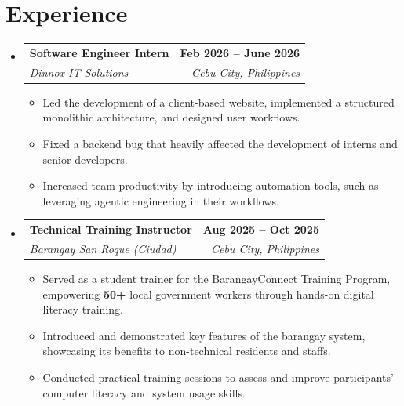 \documentclass[letterpaper,11pt]{article}
\makeatletter
\newcommand{\resumeItem}[1]{
  \item\small{
    {#1 \vspace{0pt}}
  }
}
\newcommand{\resumeSubheading}[4]{
  \vspace{-2pt}\item
    \begin{tabular*}{1.0\textwidth}[t]{l@{\extracolsep{\fill}}r}
      \textbf{#1} & \textbf{\small #2} \\
      \textit{\small#3} & \textit{\small #4} \\
    \end{tabular*}\vspace{-7pt}
}
\newcommand{\resumeSubHeadingListStart}{\begin{itemize}[leftmargin=0.0in, label={}]}
\newcommand{\resumeSubHeadingListEnd}{\end{itemize}}\vspace{0pt}
\newcommand{\resumeItemListStart}{\begin{itemize}}
\newcommand{\resumeItemListEnd}{\end{itemize}\vspace{-5pt}}
\makeatother
\begin{document}
\section{Experience}
    \resumeSubHeadingListStart
      \resumeSubheading{Software Engineer Intern}{Feb 2026 -- June 2026}{Dinnox IT Solutions}{Cebu City, Philippines} 
        \resumeItemListStart
          \resumeItem{Led the development of a client-based website, implemented a structured monolithic architecture, and designed user workflows.}
          \resumeItem{Fixed a backend bug that heavily affected the development of interns and senior developers.}
          \resumeItem{Increased team productivity by introducing automation tools, such as leveraging agentic engineering in their workflows.}
        \resumeItemListEnd
      \resumeSubheading{Technical Training Instructor}{Aug 2025 -- Oct 2025}{Barangay San Roque (Ciudad)}{Cebu City, Philippines} 
        \resumeItemListStart
          \resumeItem{Served as a student trainer for the BarangayConnect Training Program, empowering \textbf{50+} local government workers through hands-on digital literacy training.}
          \resumeItem{Introduced and demonstrated key features of the barangay system, showcasing its benefits to non-technical residents and staffs.}
          \resumeItem{Conducted practical training sessions to assess and improve participants' computer literacy and system usage skills.}
        \resumeItemListEnd
    \resumeSubHeadingListEnd
    \vspace{-12pt}

\end{document}
